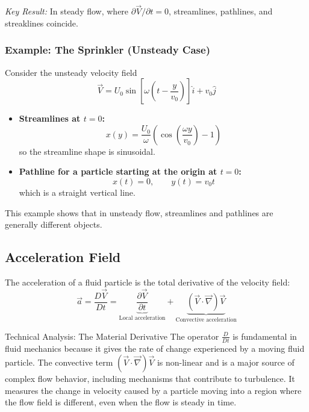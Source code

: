 \textit{Key Result:} In steady flow, where $\partial \vec{V}/\partial t = 0$, streamlines, pathlines, and streaklines coincide.

\subsubsection{Example: The Sprinkler (Unsteady Case)}

Consider the unsteady velocity field
\begin{equation}
    \vec{V} = U_0 \sin\!\left[\omega\!\left(t - \frac{y}{v_0}\right)\right]\hat{i} + v_0 \hat{j}
\end{equation}

\begin{itemize}
    \item \textbf{Streamlines at $t=0$:}  
    \begin{equation}
        x(y) = \frac{U_0}{\omega}\left(\cos\!\left(\frac{\omega y}{v_0}\right) - 1\right)
    \end{equation}
    so the streamline shape is sinusoidal.

    \item \textbf{Pathline for a particle starting at the origin at $t=0$:}  
    \begin{equation}
        x(t)=0, \qquad y(t)=v_0 t
    \end{equation}
    which is a straight vertical line.
\end{itemize}

This example shows that in unsteady flow, streamlines and pathlines are generally different objects.

\subsection{Acceleration Field}

The acceleration of a fluid particle is the total derivative of the velocity field:
\begin{equation}
    \vec{a} = \frac{D\vec{V}}{Dt}
    = \underbrace{\frac{\partial \vec{V}}{\partial t}}_{\text{Local acceleration}}
    + \underbrace{(\vec{V}\cdot\vec{\nabla})\vec{V}}_{\text{Convective acceleration}}
\end{equation}

\begin{mainbox}{Technical Analysis: The Material Derivative}
The operator $\frac{D}{Dt}$ is fundamental in fluid mechanics because it gives the rate of change experienced by a moving fluid particle. The convective term $(\vec{V}\cdot\vec{\nabla})\vec{V}$ is non-linear and is a major source of complex flow behavior, including mechanisms that contribute to turbulence. It measures the change in velocity caused by a particle moving into a region where the flow field is different, even when the flow is steady in time.
\end{mainbox}

